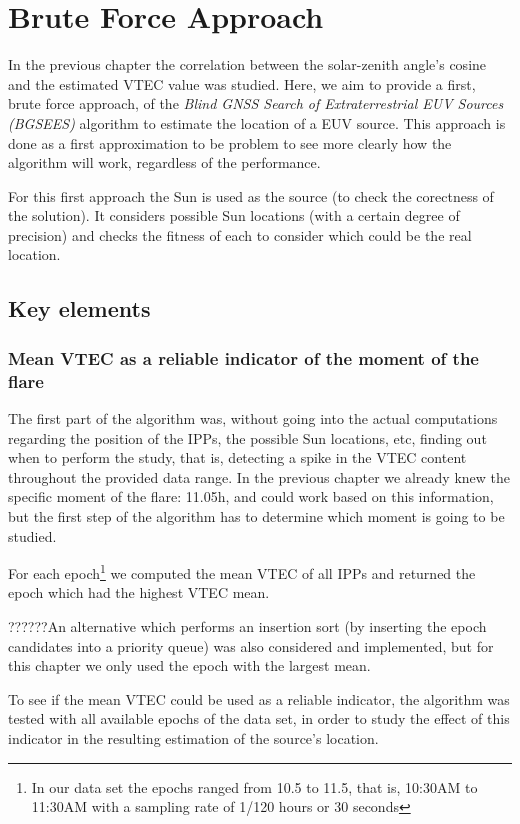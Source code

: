 \chapter{Brute Force Approach}

In the previous chapter the correlation between the solar-zenith angle's cosine and the estimated VTEC value was studied. Here, we aim to provide a first, brute force approach, of the \textit{Blind GNSS Search of Extraterrestrial EUV Sources (BGSEES)} algorithm to estimate the location of a EUV source. This approach is done as a first approximation to be problem to see more clearly how the algorithm will work, regardless of the performance.

For this first approach the Sun is used as the source (to check the corectness of the solution). It considers possible Sun locations (with a certain degree of precision) and checks the fitness of each to consider which could be the real location.

\section{Key elements}

\subsection{Mean VTEC as a reliable indicator of the moment of the flare}

The first part of the algorithm was, without going into the actual computations regarding the position of the IPPs, the possible Sun locations, etc, finding out when to perform the study, that is, detecting a spike in the VTEC content throughout the provided data range. 
In the previous chapter we already knew the specific moment of the flare: 11.05h, and could work based on this information, but the first step of the algorithm has to determine which moment is going to be studied.

For each epoch\footnote{In our data set the epochs ranged from 10.5 to 11.5, that is, 10:30AM to 11:30AM with a sampling rate of 1/120 hours or 30 seconds} we computed the mean VTEC of all IPPs and returned the epoch which had the highest VTEC mean.

??????An alternative which performs an insertion sort (by inserting the epoch candidates into a priority queue) was also considered and implemented, but for this chapter we only used the epoch with the largest mean.

To see if the mean VTEC could be used as a reliable indicator, the algorithm was tested with all available epochs of the data set, in order to study the effect of this indicator in the resulting estimation of the source's location.

